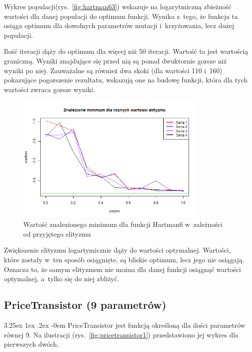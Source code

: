 \documentclass[11pt, a4paper]{article}
\makeatletter
\newcommand{\fbi}{\leavevmode{\parindent=1em\indent}}
\renewcommand\paragraph{\@startsection{paragraph}{5}{\z@}
  {3.25ex \@plus1ex \@minus.2ex}
  {-0em}
  {\normalfont\normalsize\bfseries}}
\makeatother
\begin{document}
\fbi
Wykres populacji(rys.~\ref{fig:hartman63}) wskazuje na logarytmiczną zbieżność wartości dla danej populacji do optimum funkcji. Wynika z~tego, że funkcja ta osiąga optimum dla dowolnych parametrów mutacji i~krzyżowania, lecz dużej populacji.

\fbi
Ilość iteracji dąży do optimum dla więcej niż 50 iteracji. Wartość ta jest wartością graniczną. Wyniki znajdujące się przed nią są ponad dwuktornie gorsze niż wyniki po niej. Zauważalne są również dwa skoki (dla wartości 110 i~160) pokazujące pogorszenie rezultatu, wskazują one na budowę funkcji, która dla tych wartości zwraca gorsze wyniki.

\begin{figure}[H]
	\begin{center}
		\includegraphics[width=0.85\textwidth]{./assets/Hartman66.png}
		\caption{Wartość znalezionego minimum dla funkcji Hartman6 w~zależności od przyjętego elityzmu}
		\label{fig:hartman66}
	\end{center}
\end{figure}

\fbi
Zwiększenie elityzmu logartymicznie dąży do wartości optymalnej. Wartości, które zostały w~ten sposób osiągnięte, są bliskie optimum, lecz jego nie osiągają. Oznacza to, że samym elityzmem nie można dla danej funkcji osiągnąć wartości optymalnej, a~tylko się do niej zbliżyć.

\newpage
\subsection{PriceTransistor (9 parametrów)}
\paragraph{}
PriceTransistor jest funkcją określoną dla ilości parametrów równej 9. Na ilustracji (rys.~\ref{fig:pricetransistor1}) przedstawiono jej wykres dla pierwszych dwóch.
\end{document}
